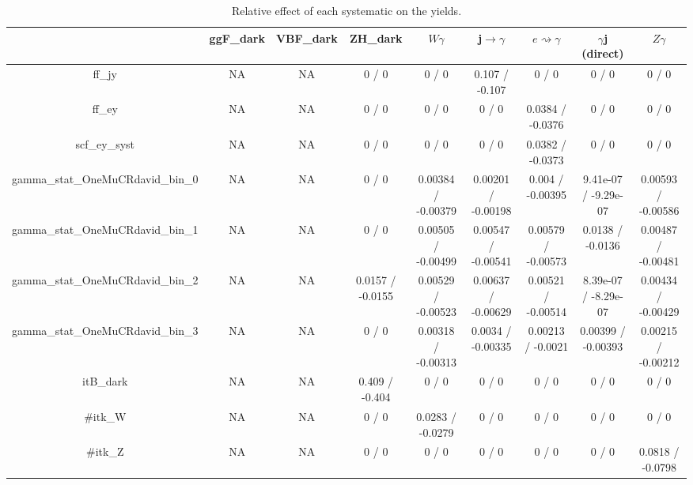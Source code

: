 \documentclass[10pt]{article}
\begin{document}
\begin{table}[htbp]
\begin{center}
\begin{tabular}{|c|c|c|c|c|c|c|c|c|}
\hline 
      & ggF_{dark}      & VBF_{dark}      & ZH_{dark}      & $W\gamma$      & j$\rightarrow\gamma$      & $e\rightsquigarrow\gamma$      & $\gamma$j (direct)      & $Z\gamma$ \\ 
\hline 
  ff_jy &    NA    &    NA    & 0 / 0 & 0 / 0 & 0.107 / -0.107 & 0 / 0 & 0 / 0 & 0 / 0 \\ 
  ff_ey &    NA    &    NA    & 0 / 0 & 0 / 0 & 0 / 0 & 0.0384 / -0.0376 & 0 / 0 & 0 / 0 \\ 
  scf_ey_syst &    NA    &    NA    & 0 / 0 & 0 / 0 & 0 / 0 & 0.0382 / -0.0373 & 0 / 0 & 0 / 0 \\ 
  gamma_stat_OneMuCRdavid_bin_0 &    NA    &    NA    & 0 / 0 & 0.00384 / -0.00379 & 0.00201 / -0.00198 & 0.004 / -0.00395 & 9.41e-07 / -9.29e-07 & 0.00593 / -0.00586 \\ 
  gamma_stat_OneMuCRdavid_bin_1 &    NA    &    NA    & 0 / 0 & 0.00505 / -0.00499 & 0.00547 / -0.00541 & 0.00579 / -0.00573 & 0.0138 / -0.0136 & 0.00487 / -0.00481 \\ 
  gamma_stat_OneMuCRdavid_bin_2 &    NA    &    NA    & 0.0157 / -0.0155 & 0.00529 / -0.00523 & 0.00637 / -0.00629 & 0.00521 / -0.00514 & 8.39e-07 / -8.29e-07 & 0.00434 / -0.00429 \\ 
  gamma_stat_OneMuCRdavid_bin_3 &    NA    &    NA    & 0 / 0 & 0.00318 / -0.00313 & 0.0034 / -0.00335 & 0.00213 / -0.0021 & 0.00399 / -0.00393 & 0.00215 / -0.00212 \\ 
  it{B}_{dark} &    NA    &    NA    & 0.409 / -0.404 & 0 / 0 & 0 / 0 & 0 / 0 & 0 / 0 & 0 / 0 \\ 
  #it{k_{W}} &    NA    &    NA    & 0 / 0 & 0.0283 / -0.0279 & 0 / 0 & 0 / 0 & 0 / 0 & 0 / 0 \\ 
  #it{k_{Z}} &    NA    &    NA    & 0 / 0 & 0 / 0 & 0 / 0 & 0 / 0 & 0 / 0 & 0.0818 / -0.0798 \\ 
\hline 
\end{tabular} 
\caption{Relative effect of each systematic on the yields.} 
\end{center} 
\end{table} 
\end{document}
